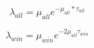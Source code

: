 \documentclass{article}
\begin{document}
\[ \lambda_{all} = \mu_{all} e^{-\mu_{all}*\tau_{all}} \]
\pagebreak

\[ \lambda_{win} = \mu_{win} e^{-2\mu_{all}\tau_{win}} \]
\pagebreak
\end{document}
